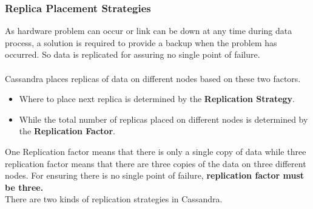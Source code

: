 \documentclass[10pt,a4paper]{article}
\newcommand{\nline}{\\~\\}
\begin{document}
\subsubsection{Replica Placement Strategies}
As hardware problem can occur or link can be down at any time during data process, a solution is required to provide a backup when the problem has occurred. So data is replicated for assuring no single point of failure. \nline
Cassandra places replicas of data on different nodes based on these two factors.
\begin{itemize}
	\item Where to place next replica is determined by the \textbf{Replication Strategy}.
	\item While the total number of replicas placed on different nodes is determined by the \textbf{Replication Factor}.
\end{itemize}
One Replication factor means that there is only a single copy of data while three replication factor means that there are three copies of the data on three different nodes. For ensuring there is no single point of failure, \textbf{replication factor must be three.} \pagebreak \\
There are two kinds of replication strategies in Cassandra.
\end{document}
